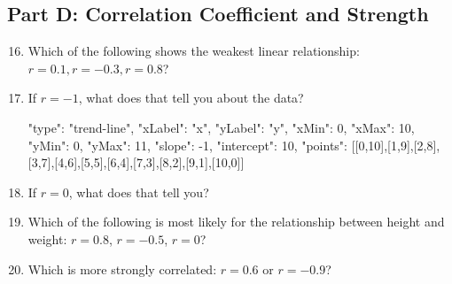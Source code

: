 \documentclass[14pt]{extarticle}
\begin{document}
\subsection*{Part D: Correlation Coefficient and Strength}
\begin{enumerate}
  \setcounter{enumi}{15}
  \item Which of the following shows the weakest linear relationship: \(r = 0.1, r = -0.3, r = 0.8\)?
  \item If \(r = -1\), what does that tell you about the data?
  \begin{diagramdata}
  {
    "type": "trend-line",
    "xLabel": "x",
    "yLabel": "y",
    "xMin": 0,
    "xMax": 10,
    "yMin": 0,
    "yMax": 11,
    "slope": -1,
    "intercept": 10,
    "points": [[0,10],[1,9],[2,8],[3,7],[4,6],[5,5],[6,4],[7,3],[8,2],[9,1],[10,0]]
  }
  \end{diagramdata}
  \DiagramAfterReveal
  \item If \(r = 0\), what does that tell you?
  \item Which of the following is most likely for the relationship between height and weight: \(r = 0.8\), \(r = -0.5\), \(r = 0\)?
  \item Which is more strongly correlated: \(r = 0.6\) or \(r = -0.9\)?
\end{enumerate}
\end{document}
